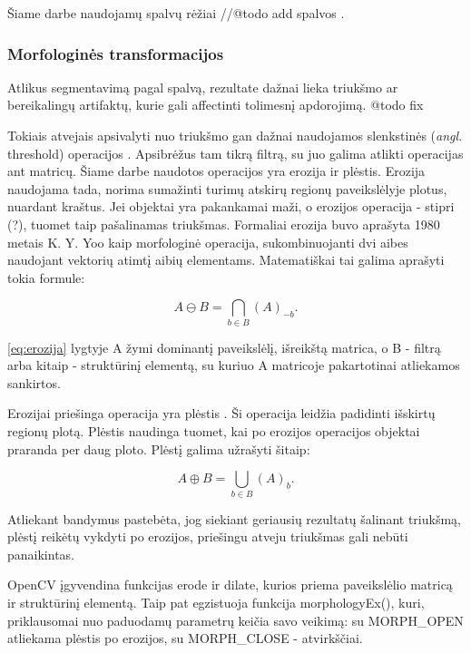 \documentclass{VUMIFPSbakalaurinis}
\begin{document}
Šiame darbe naudojamų spalvų rėžiai //@todo add spalvos .

\subsubsection{Morfologinės transformacijos}
Atlikus segmentavimą pagal spalvą, rezultate dažnai lieka triukšmo ar bereikalingų artifaktų, kurie gali affectinti tolimesnį apdorojimą. @todo fix

Tokiais atvejais apsivalyti nuo triukšmo gan dažnai naudojamos slenkstinės (\textit{angl.} threshold) operacijos \cite[112]{SzeliskiCompVision}. Apsibrėžus tam tikrą filtrą, su juo galima atlikti operacijas ant matricų. Šiame darbe naudotos operacijos yra erozija ir plėstis. Erozija naudojama tada, norima sumažinti turimų atskirų regionų paveikslėlyje plotus, nuardant kraštus. Jei objektai yra pakankamai maži, o erozijos operacija - stipri (?), tuomet taip pašalinamas triukšmas. Formaliai erozija buvo aprašyta 1980 metais K. Y. Yoo \cite{4767941} kaip morfologinė operacija, sukombinuojanti dvi aibes naudojant vektorių atimtį aibių elementams. Matematiškai tai galima aprašyti tokia formule: 

\begin{equation}\label{eq:erozija}
	A \ominus B = \bigcap_ {b \in B } (A)_{-b} .
\end{equation}

\ref{eq:erozija} lygtyje A žymi dominantį paveikslėlį, išreikštą matrica, o B - filtrą arba kitaip - struktūrinį elementą, su kuriuo A matricoje pakartotinai atliekamos sankirtos.  

Erozijai priešinga operacija yra plėstis \cite{4767941}. Ši operacija leidžia padidinti išskirtų regionų plotą. Plėstis naudinga tuomet, kai po erozijos operacijos objektai praranda per daug ploto. Plėstį galima užrašyti šitaip:

\begin{equation}\label{eq:plestis}
	A \oplus B = \bigcup_ {b \in B } (A)_{b} .
\end{equation}

Atliekant bandymus pastebėta, jog siekiant geriausių rezultatų šalinant triukšmą, plėstį reikėtų vykdyti po erozijos, priešingu atveju triukšmas gali nebūti panaikintas. 

OpenCV įgyvendina funkcijas erode ir dilate, kurios priema paveikslėlio matricą ir struktūrinį elementą. Taip pat egzistuoja funkcija morphologyEx(), kuri, priklausomai nuo paduodamų parametrų keičia savo veikimą: su MORPH\_OPEN atliekama plėstis po erozijos, su MORPH\_CLOSE - atvirkščiai. 
\end{document}
